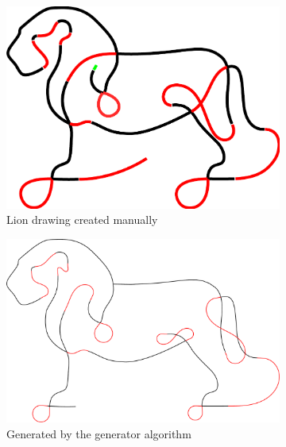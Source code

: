 \begin{figure}
\begin{subfigure}[t]{0.45\textwidth}
	\includegraphics[width=\textwidth]{images/results/lion/lion_handmade.pdf}
	\caption{Lion drawing created manually}
\end{subfigure}
\begin{subfigure}[t]{0.45\textwidth}
	\includegraphics[width=\textwidth]{images/results/lion/lion_generated_2.pdf}
	\caption{Generated by the generator algorithm}
\end{subfigure}
\par\bigskip %
\begin{subfigure}[t]{0.45\textwidth}

\end{subfigure}
\end{figure}
